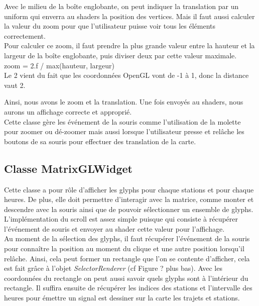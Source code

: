 \documentclass[12pt]{article}
\begin{document}
	Avec le milieu de la boîte englobante, on peut indiquer la translation par un uniform qui enverra au shaders la position des vertices. Mais il faut aussi calculer la valeur du zoom pour que l’utilisateur puisse voir tous les éléments correctement.\\

	Pour calculer ce zoom, il faut prendre la plus grande valeur entre la hauteur et la largeur de la boîte englobante, puis diviser deux par cette valeur maximale.\\

	zoom = 2.f / max(hauteur, largeur)\\

	Le 2 vient du fait que les coordonnées OpenGL vont de -1 à 1, donc la distance vaut 2.

	Ainsi, nous avons le zoom et la translation. Une fois envoyés au shaders, nous aurons un affichage correcte et approprié.\\

	Cette classe gère les événement de la souris comme l’utilisation de la molette pour zoomer ou dé-zoomer mais aussi lorsque l’utilisateur presse et relâche les boutons de sa souris pour effectuer des translation de la carte.
		
		\subsection{Classe MatrixGLWidget}		
		Cette classe a pour rôle d’afficher les glyphs pour chaque stations et pour chaque heures. De plus, elle doit permettre d’interagir avec la matrice, comme monter et descendre avec la souris ainsi que de pouvoir sélectionner un ensemble de glyphs.\\

		L'implémentation du scroll est assez simple puisque qui consiste à récupérer l'événement de souris et envoyer au shader cette valeur pour l’affichage.\\

		Au moment de la sélection des glyphs, il faut récupérer l'événement de la souris pour connaître la position au moment du clique et une autre position lorsqu’il relâche. Ainsi, cela peut former un rectangle que l’on se contente d’afficher, cela est fait grâce à l’objet \textit{SelectorRenderer} (cf Figure ? plus bas). Avec les coordonnées du rectangle on peut aussi savoir quels glyphs sont à l'intérieur du rectangle. Il suffira ensuite de récupérer les indices des stations et l’intervalle des heures pour émettre un signal est dessiner sur la carte les trajets et stations.\\
\end{document}
